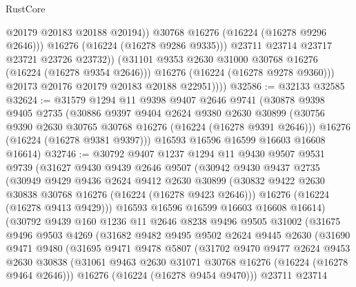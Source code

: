 \begin{lexlean}{RustCore}
\begin{coremodule}
                          @20179
                          @20183
                          @20188
                          @20194))
                      @30768
                      @16276
                      (@16224 (@16278 @9296 @2646)))
                    @16276
                    (@16224 (@16278 @9286 @9335)))
                  @23711
                  @23714
                  @23717
                  @23721
                  @23726
                  @23732))
              (@31101 @9353 @2630 @31000 @30768 @16276 (@16224 (@16278 @9354 @2646)))
              @16276
              (@16224 (@16278 @9278 @9360)))
            @20173
            @20176
            @20179
            @20183
            @20188
            @22951))))
@32586 := @32133 @32585
@32624 := @31579
    @1294
    @11
    @9398
    @9407
    @2646
    @9741
    (@30878
      @9398
      @9405
      @2735
      (@30886
        @9397
        @9404
        @2624
        @9380
        @2630
        @30899
        (@30756 @9390 @2630 @30765 @30768 @16276 (@16224 (@16278 @9391 @2646)))
        @16276
        (@16224 (@16278 @9381 @9397)))
      @16593
      @16596
      @16599
      @16603
      @16608
      @16614)
@32746 := @30792
    @9407
    @1237
    @1294
    @11
    @9430
    @9507
    @9531
    @9739
    (@31627
      @9430
      @9439
      @2646
      @9507
      (@30942
        @9430
        @9437
        @2735
        (@30949
          @9429
          @9436
          @2624
          @9412
          @2630
          @30899
          (@30832 @9422 @2630 @30838 @30768 @16276 (@16224 (@16278 @9423 @2646)))
          @16276
          (@16224 (@16278 @9413 @9429)))
        @16593
        @16596
        @16599
        @16603
        @16608
        @16614)
      (@30792
        @9439
        @160
        @1236
        @11
        @2646
        @8238
        @9496
        @9505
        @31002
        (@31675
          @9496
          @9503
          @4269
          (@31682
            @9482
            @9495
            @9502
            @2624
            @9445
            @2630
            (@31690
              @9471
              @9480
              (@31695
                @9471
                @9478
                @5807
                (@31702
                  @9470
                  @9477
                  @2624
                  @9453
                  @2630
                  @30838
                  (@31061 @9463 @2630 @31071 @30768 @16276 (@16224 (@16278 @9464 @2646)))
                  @16276
                  (@16224 (@16278 @9454 @9470)))
                @23711
                @23714

\end{coremodule}
\end{lexlean}
